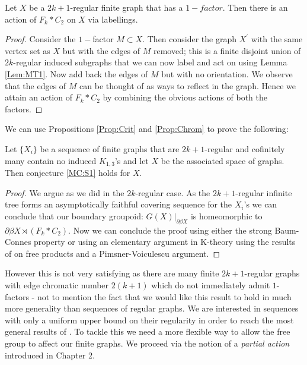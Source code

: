\begin{conjecture}
\begin{proposition}\label{Prop:Chrom}
Let $X$ be a $2k+1$-regular finite graph that has a $1-factor$. Then there is an action of $F_{k}\ast C_{2}$ on $X$ via labellings.
\end{proposition}
\begin{proof}
Consider the $1-$factor $M\subset X$. Then consider the graph $X^{'}$ with the same vertex set as $X$ but with the edges of $M$ removed; this is a finite disjoint union of $2k$-regular induced subgraphs that we can now label and act on using Lemma \ref{Lem:MT1}. Now add back the edges of $M$ but with no orientation. We observe that the edges of $M$ can be thought of as ways to reflect in the graph. Hence we attain an action of $F_{k}\ast C_{2}$ by combining the obvious actions of both the factors. 
\end{proof}

We can use Propositions \ref{Prop:Crit} and \ref{Prop:Chrom} to prove the following:

\begin{theorem}\label{Thm:MR2}
Let $\lbrace X_{i} \rbrace$ be a sequence of finite graphs that are $2k+1$-regular and cofinitely many contain no induced $K_{1,3}$'s and let $X$ be the associated space of graphs. Then conjecture \ref{MC:S1} holds for $X$.
\end{theorem}
\begin{proof}
We argue as we did in the $2k$-regular case. As the $2k+1$-regular infinite tree forms an asymptotically faithful covering sequence for the $X_{i}$'s we can conclude that our boundary groupoid: $G(X)|_{\partial \beta X}$ is homeomorphic to $\partial\beta X\rtimes (F_{k}\ast C_{2})$. Now we can conclude the proof using either the strong Baum-Connes property or using an elementary argument in K-theory using the results of \cite{MR723010} on free products and a Pimsner-Voiculescu argument.
\end{proof}

However this is not very satisfying as there are many finite $2k+1$-regular graphs with edge chromatic number $2(k+1)$ which do not immediately admit $1$-factors - not to mention the fact that we would like this result to hold in much more generality than sequences of regular graphs. We are interested in sequences with only a uniform upper bound on their regularity in order to reach the most general results of \cite{explg1}. To tackle this we need a more flexible way to allow the free group to affect our finite graphs. We proceed via the notion of a \textit{partial action} introduced in Chapter 2.


\end{conjecture}
